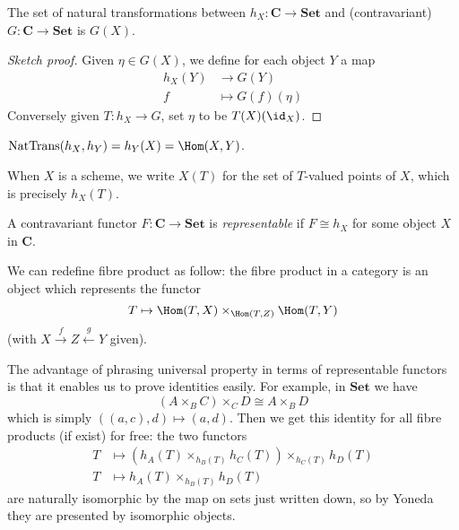 \documentclass[a4paper]{article}
\renewcommand{\c}[1]{\mathbf{#1}} %
\begin{document}
\begin{theorem}
  The set of natural transformations between \(h_X: \c C \to \c{Set}\) and (contravariant) \(G: \c C \to \c{Set}\) is \(G(X)\).
\end{theorem}

\begin{proof}[Sketch proof]
  Given \(\eta \in G(X)\), we define for each object \(Y\) a map
  \begin{align*}
    h_X(Y) &\to G(Y) \\
    f &\mapsto G(f)(\eta)
  \end{align*}
  Conversely given \(T: h_X \to G\), set \(\eta\) to be \(T(X)(\id_X)\).
\end{proof}

\begin{corollary}
  \(\operatorname{NatTrans}(h_X, h_Y) = h_Y(X) = \Hom(X, Y)\).
\end{corollary}

\begin{remark}
  When \(X\) is a scheme, we write \(X(T)\) for the set of \(T\)-valued points of \(X\), which is precisely \(h_X(T)\).
\end{remark}

\begin{definition}
  A contravariant functor \(F: \c C \to \c{Set}\) is \emph{representable} if \(F \cong h_X\) for some object \(X\) in \(\c C\).
\end{definition}

We can redefine fibre product as follow: the fibre product in a category is an object which represents the functor
\[
  T \mapsto \Hom(T, X) \times_{\Hom(T, Z)} \Hom(T, Y)
\]
(with \(X \xrightarrow{f} Z \xleftarrow{g} Y\) given).

The advantage of phrasing universal property in terms of representable functors is that it enables us to prove identities easily. For example, in \(\c{Set}\) we have
\[
  (A \times_B C) \times_C D \cong A \times_B D
\]
which is simply \(((a, c), d) \mapsto (a, d)\). Then we get this identity for all fibre products (if exist) for free: the two functors
\begin{align*}
  T &\mapsto (h_A(T) \times_{h_B(T)} h_C(T)) \times_{h_C(T)} h_D(T) \\
  T &\mapsto h_A(T) \times_{h_B(T)} h_D(T)
\end{align*}
are naturally isomorphic by the map on sets just written down, so by Yoneda they are presented by isomorphic objects.
\end{document}
